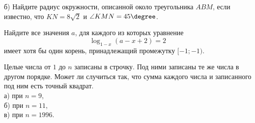\begin{training}[2]
\begin{listofex}
		б)  Найдите радиус окружности, описанной около треугольника \( ABM \), если известно, что \( KN=8\sqrt{2} \) и \( \angle KMN=45\degree \).
		\item Найдите все значения \( a \), для каждого из которых уравнение \[ \log_{1-x}(a-x+2)=2 \] имеет хотя бы один корень, принадлежащий промежутку \( [-1;-1) \).
		\item Целые числа от \( 1 \) до \( n \) записаны в строчку. Под ними записаны те же числа в другом порядке. Может ли случиться так, что сумма каждого числа и записанного под ним есть точный квадрат.\\
		а)  при \( n=9 \),\\		
		б)  при \( n=11 \),\\		
		в)  при \( n=1996 \).
	\end{listofex}
\end{training}
